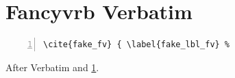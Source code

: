 \documentclass{article}
\begin{document}
\section{Fancyvrb Verbatim}\label{sec:env_fv}
\begin{Verbatim}[numbers=left]
\cite{fake_fv} { \label{fake_lbl_fv} %
\end{Verbatim}
After Verbatim \cite{k1} and \ref{sec:env_fv}.


\end{document}
